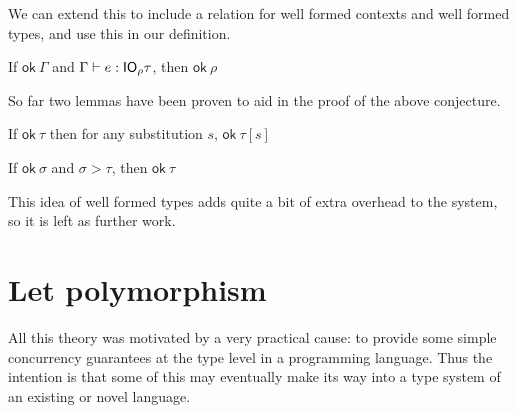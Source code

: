 We can extend this to include a relation for well formed contexts and
well formed types, and use this in our definition. 


\begin{conjecture}
  If $\textsf{ok} \ \Gamma$ and $\Gamma \vdash e : \mathsf{IO}_\rho \tau$, then $\textsf{ok} \ \rho$
\end{conjecture}
So far two lemmas have been proven to aid in the proof of the above
conjecture.
\begin{lemma}
  If $\textsf{ok} \ \tau$ then for any substitution $s$, $\textsf{ok} \ \tau[s]$
\end{lemma}
\begin{lemma}
  If $\textsf{ok} \ \sigma$ and $\sigma > \tau$, then $\textsf{ok} \ \tau$
\end{lemma}
This idea of well formed types adds quite a bit
of extra overhead to the system, so it is left as further work.

\section{Let polymorphism}
All this theory was motivated by a very practical cause: to provide
some simple concurrency guarantees at the type level in a programming
language. Thus the intention is that some of this may eventually make
its way into a type system of an existing or novel language.

